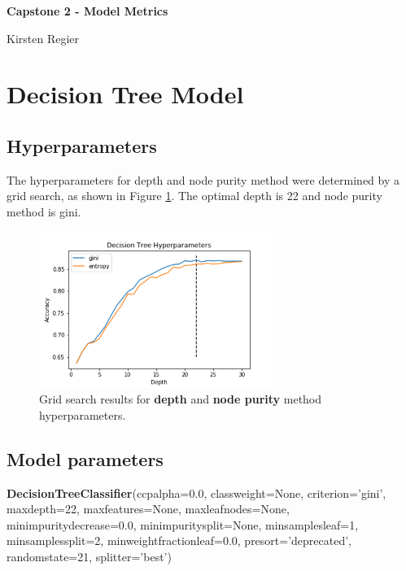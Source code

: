 \documentclass[11pt, letterpaper]{article}
\begin{document}
\begin{center}
\Large{\textbf{Capstone 2 - Model Metrics}}

\large{Kirsten Regier}
\end{center}

\section{Decision Tree Model}
\subsection{Hyperparameters}
The hyperparameters for depth and node purity method were determined by a grid search, as shown in Figure \ref{fig:DTHyper}. The optimal depth is 22 and node purity method is gini.

\begin{figure}[h]
\begin{center}
\includegraphics[width=3in]{DTHyperparameters.png}
\caption{Grid search results for \textbf{depth} and \textbf{node purity} method hyperparameters.} 
\label{fig:DTHyper}
\end{center}
\end{figure}

\subsection{Model parameters}
\noindent \textbf{DecisionTreeClassifier}(ccp\textunderscore alpha=0.0, class\textunderscore weight=None, criterion='gini', 
max\textunderscore depth=22, \newline 
max\textunderscore features=None, 
max\textunderscore leaf\textunderscore nodes=None, 
min\textunderscore impurity\textunderscore decrease=0.0, 
min\textunderscore impurity\textunderscore split=None, 
min\textunderscore samples\textunderscore leaf=1, 
min\textunderscore samples\textunderscore split=2, 
min\textunderscore weight\textunderscore fraction\textunderscore leaf=0.0, presort='deprecated', random\textunderscore state=21, splitter='best')
\end{document}
